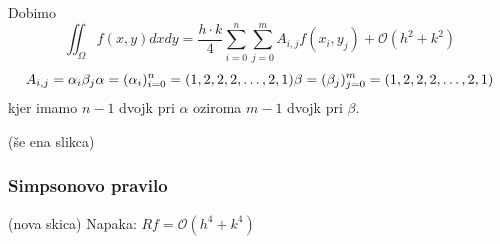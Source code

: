 \documentclass[a4paper,12pt]{article}
\theoremstyle{definition}
\theoremstyle{remark}
\begin{document}
Dobimo
\begin{equation*}
    \iint_{\Omega} f(x, y) dx dy = \frac{h \cdot k}{4} \sum_{i=0}^{n} \sum_{j=0}^{m} A_{i, j} f(x_i, y_j) + \mathcal{O}(h^2 + k^2)    
\end{equation*}
\begin{equation*}
    A_{i, j} = \alpha_i \beta_j \\
    \alpha = (\alpha_i)_{i=0}^n = (1, 2, 2, 2, \dots, 2, 1)
    \beta = (\beta_j)_{j=0}^m = (1, 2, 2, 2, \dots, 2, 1)
\end{equation*}
kjer imamo $n-1$ dvojk pri $\alpha$ oziroma $m-1$ dvojk pri $\beta$.

(še ena slikca)

\subsubsection{Simpsonovo pravilo}
(nova skica)
Napaka: $Rf = \mathcal{O}(h^4 + k^4)$
\end{document}
